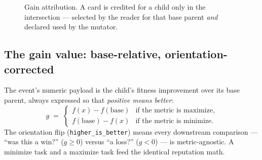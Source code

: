 \documentclass[11pt]{article}
\newcommand{\code}[1]{\texttt{\small #1}}
\newcommand{\gain}{g}
\begin{document}
\begin{figure}[ht]
\centering
{}
\caption{Gain attribution. A card is credited for a child only in the
intersection --- selected by the reader for that base parent \emph{and} declared
used by the mutator.}
\label{fig:attribution}
\end{figure}

\subsection{The gain value: base-relative, orientation-corrected}

The event's numeric payload is the child's fitness improvement over its base
parent, always expressed so that \emph{positive means better}:
\[
  \gain \;=\;
  \begin{cases}
     f(x) - f(\text{base}) & \text{if the metric is maximize},\\[2pt]
     f(\text{base}) - f(x) & \text{if the metric is minimize.}
  \end{cases}
\]
The orientation flip (\code{higher\_is\_better}) means every downstream comparison
--- ``was this a win?'' ($\gain \ge 0$) versus ``a loss?'' ($\gain < 0$) --- is
metric-agnostic. A minimize task and a maximize task feed the identical reputation
math.
\end{document}

